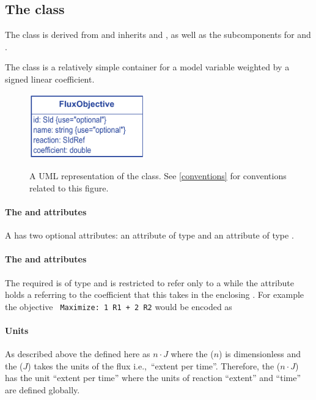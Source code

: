 \subsection{The \FBC {} class}
\label{fluxobjective-class}

The \FBC \FluxObjective class is derived from \SBML \SBase and inherits
 and , as well as the subcomponents for
\Annotation and \Notes.

The \FluxObjective class is a relatively simple container for a model
variable weighted by a signed linear coefficient.

%
\begin{figure}[ht]
  \centering
  \includegraphics[width=5cm]{images/v2harmony_fbc_fluxobjective.pdf}\\
  \caption{A UML representation of the \FBCPackage \FluxObjective class. See
  \ref{conventions} for conventions related to this figure.}
  \label{fig:fbc_uml_fobj}
\end{figure}

\paragraph{The  and  attributes}
A \FluxObjective has two optional attributes:  an attribute of
type  and  an attribute of type .

\pagebreak
\paragraph{The  and  attributes}
The required  is of type  and is restricted
to refer only to a \Reaction while the  attribute
holds a  referring to the coefficient that this \FluxObjective
takes in the enclosing \Objective. For example the objective
\texttt{ Maximize: 1 R1 + 2 R2} would be encoded as
%


\paragraph{Units}
As described above the \FluxObjective defined here as $n\cdot J$ where
the  ($n$) is dimensionless and the  ($J$)
takes the units of the  flux i.e.,~``extent per time''.
Therefore, the \FluxObjective ($n\cdot J$)  has the unit ``extent per time''
where the units of reaction ``extent'' and ``time'' are defined globally.


